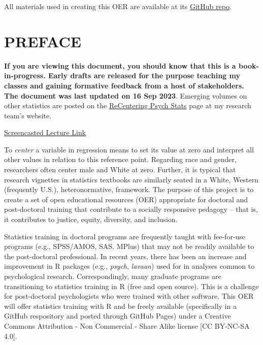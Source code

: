 \documentclass[
  11pt,
]{book}
\begin{document}
All materials used in creating this OER are available at its \href{https://github.com/lhbikos/ReC_MultivModel}{GitHub repo}.

\hypertarget{preface}{%
\chapter*{PREFACE}\label{preface}}


\textbf{If you are viewing this document, you should know that this is a book-in-progress. Early drafts are released for the purpose teaching my classes and gaining formative feedback from a host of stakeholders. The document was last updated on 16 Sep 2023}. Emerging volumes on other statistics are posted on the \href{https://lhbikos.github.io/BikosRVT/ReCenter.html}{ReCentering Psych Stats} page at my research team's website.

\href{https://spu.hosted.panopto.com/Panopto/Pages/Viewer.aspx?id=c932455e-ef06-444a-bdca-acf7012d759a}{Screencasted Lecture Link}

To \emph{center} a variable in regression means to set its value at zero and interpret all other values in relation to this reference point. Regarding race and gender, researchers often center male and White at zero. Further, it is typical that research vignettes in statistics textbooks are similarly seated in a White, Western (frequently U.S.), heteronormative, framework. The purpose of this project is to create a set of open educational resources (OER) appropriate for doctoral and post-doctoral training that contribute to a socially responsive pedagogy -- that is, it contributes to justice, equity, diversity, and inclusion.

Statistics training in doctoral programs are frequently taught with fee-for-use programs (e.g., SPSS/AMOS, SAS, MPlus) that may not be readily available to the post-doctoral professional. In recent years, there has been an increase and improvement in R packages (e.g., \emph{psych}, \emph{lavaan}) used for in analyses common to psychological research. Correspondingly, many graduate programs are transitioning to statistics training in R (free and open source). This is a challenge for post-doctoral psychologists who were trained with other software. This OER will offer statistics training with R and be freely available (specifically in a GitHub respository and posted through GitHub Pages) under a Creative Commons Attribution - Non Commercial - Share Alike license {[}CC BY-NC-SA 4.0{]}.
\end{document}
